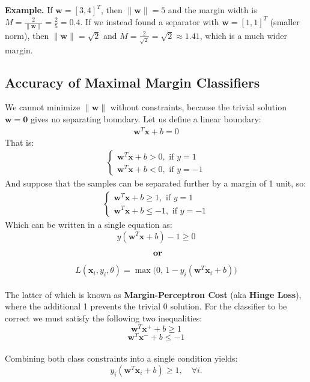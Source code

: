 \documentclass{article}
\newcommand{\smallexample}[1]{%
\begin{examplebox}
\noindent\textbf{Example.} #1
\end{examplebox}
}
\begin{document}
\smallexample{
If $\mathbf{w}=[3,4]^T$, then $\|\mathbf{w}\|=5$ and the margin width is
$M=\frac{2}{\|\mathbf{w}\|}=\frac{2}{5}=0.4$.
If we instead found a separator with $\mathbf{w}=[1,1]^T$ (smaller norm),
then $\|\mathbf{w}\|=\sqrt{2}$ and $M=\frac{2}{\sqrt{2}}=\sqrt{2}\approx 1.41$,
which is a much wider margin.
}




\subsection{Accuracy of Maximal Margin Classifiers}
We cannot minimize $\|\mathbf{w}\|$ without constraints, because the trivial solution $\mathbf{w} = \mathbf{0}$ gives no separating boundary. Let us define a linear boundary: 
\begin{align*}
\mathbf{w}^T \mathbf{x} + b = 0
\end{align*}
That is:
\begin{align*}
      \begin{cases}
        \mathbf{w}^T \mathbf{x} + b > 0, \text{ if } y = 1\\
        \mathbf{w}^T \mathbf{x} + b < 0, \text{ if } y = -1
      \end{cases}
\end{align*}
And suppose that the samples can be separated further by a margin of 1 unit, so:
\begin{align*}
      \begin{cases}
        \mathbf{w}^T \mathbf{x} + b \geq 1, \text{ if } y = 1\\
        \mathbf{w}^T \mathbf{x} + b \leq -1, \text{ if } y = -1
      \end{cases}
\end{align*}
Which can be written in a single equation as:
\[
y(\mathbf{w}^T \mathbf{x} + b) - 1 \geq 0
\]
\[
\textbf{ or}\\
\]
\[
L(\mathbf{x}_i,y_i,\theta)
= \max\big(0,\,1-y_i(\mathbf{w}^T\mathbf{x}_i+b)\big)
\]\\
The latter of which is known as \textbf{Margin-Perceptron Cost} (aka \textbf{Hinge Loss}), where the additional 1 prevents the trivial 0 solution. For the classifier to be correct we must satisfy the following two inequalities:
\[
\mathbf{w}^T \mathbf{x^+} + b \geq 1 
\]
\[
\mathbf{w}^T \mathbf{x^-} + b \leq -1 
\]\\

Combining both class constraints into a single condition yields:
\[
y_i(\mathbf{w}^T\mathbf{x}_i + b) \ge 1,\quad \forall i.
\]
\end{document}
